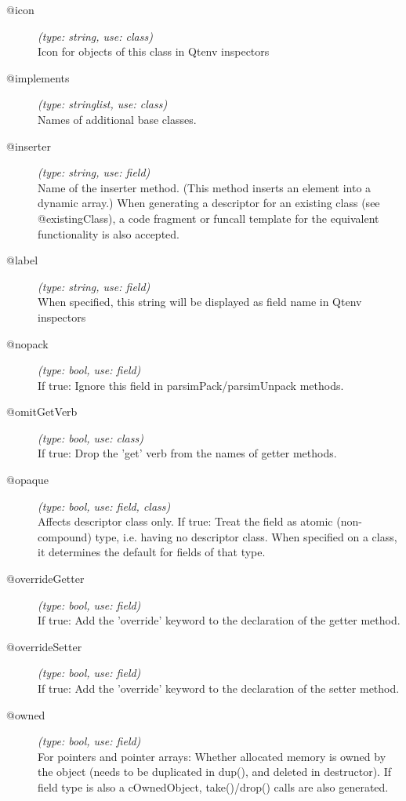 \begin{description}
\item[@icon] \textit{(type: string, use: class)} \\
  Icon for objects of this class in Qtenv inspectors

\item[@implements] \textit{(type: stringlist, use: class)} \\
  Names of additional base classes.

\item[@inserter] \textit{(type: string, use: field)} \\
  Name of the inserter method. (This method inserts an element into a dynamic
  array.) When generating a descriptor for an existing class (see
  @existingClass), a code fragment or funcall template for the equivalent
  functionality is also accepted.

\item[@label] \textit{(type: string, use: field)} \\
  When specified, this string will be displayed as field name in Qtenv
  inspectors

\item[@nopack] \textit{(type: bool, use: field)} \\
  If true: Ignore this field in parsimPack/parsimUnpack methods.

\item[@omitGetVerb] \textit{(type: bool, use: class)} \\
  If true: Drop the 'get' verb from the names of getter methods.

\item[@opaque] \textit{(type: bool, use: field, class)} \\
  Affects descriptor class only. If true: Treat the field as atomic
  (non-compound) type, i.e. having no descriptor class. When specified on a
  class, it determines the default for fields of that type.

\item[@overrideGetter] \textit{(type: bool, use: field)} \\
  If true: Add the 'override' keyword to the declaration of the getter method.

\item[@overrideSetter] \textit{(type: bool, use: field)} \\
  If true: Add the 'override' keyword to the declaration of the setter method.

\item[@owned] \textit{(type: bool, use: field)} \\
  For pointers and pointer arrays: Whether allocated memory is owned by the
  object (needs to be duplicated in dup(), and deleted in destructor). If
  field type is also a cOwnedObject, take()/drop() calls are also generated.


\end{description}
